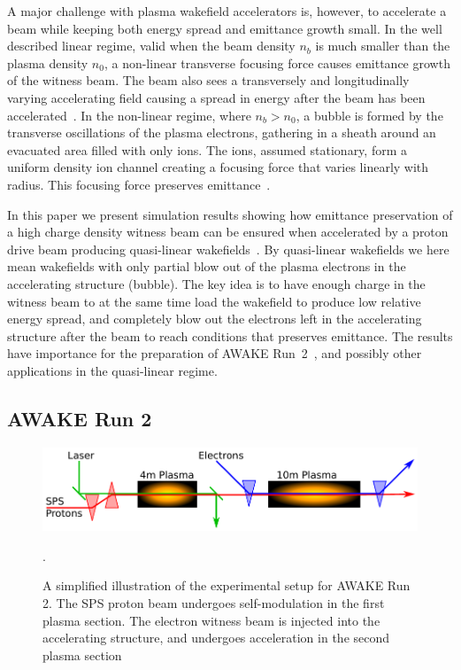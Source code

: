 \documentclass[aps,prstab,reprint,amsmath,amssymb,groupedaddress]{revtex4-1}
\begin{document}
A major challenge with plasma wakefield accelerators is, however, to accelerate a beam while keeping both energy spread and emittance growth small. In the well described linear regime, valid when the beam density $n_{b}$ is much smaller than the plasma density $n_{0}$, a non-linear transverse focusing force causes emittance growth of the witness beam. The beam also sees a transversely and longitudinally varying accelerating field causing a spread in energy after the beam has been accelerated~\cite{katsouleas:1987}. In the non-linear regime, where $n_{b} > n_{0}$, a bubble is formed by the transverse oscillations of the plasma electrons, gathering in a sheath around an evacuated area filled with only ions. The ions, assumed stationary, form a uniform density ion channel creating a focusing force that varies linearly with radius. This focusing force preserves emittance~\cite{rosenzweig:1991}.

In this paper we present simulation results showing how emittance preservation of a high charge density witness beam can be ensured when accelerated by a proton drive beam producing quasi-linear wakefields~\cite{rosenzweig:2010}. By quasi-linear wakefields we here mean wakefields with only partial blow out of the plasma electrons in the accelerating structure (bubble). The key idea is to have enough charge in the witness beam to at the same time load the wakefield to produce low relative energy spread, and completely blow out the electrons left in the accelerating structure after the beam to reach conditions that preserves emittance. The results have importance for the preparation of AWAKE Run~2~\cite{adli:2016}, and possibly other applications in the quasi-linear regime.

\subsection{AWAKE Run 2}\label{S:I:AWAKE}

\begin{figure}[hbt]
    \includegraphics[width=0.99\linewidth,trim={1mm 2mm 1mm 2mm},clip]{figures/figAWAKE}
    \caption{\label{Fig:AWAKER2} A simplified illustration of the experimental setup for AWAKE Run 2. The SPS proton beam undergoes self-modulation in the first plasma section. The electron witness beam is injected into the accelerating structure, and undergoes acceleration in the second plasma section~\cite{berglyd_olsen:2015, adli:2016}}.
\end{figure}
\end{document}
